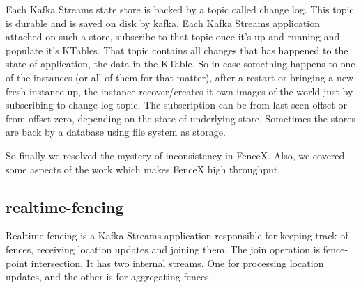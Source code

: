 \documentclass[a4]{report}
\begin{document}
    Each Kafka Streams state store is backed by a topic called change log.
    This topic is durable and is saved on disk by kafka.
    Each Kafka Streams application attached on such a store, subscribe to that topic once it's up and running and
    populate it's KTables.
    That topic contains all changes that has happened to the state of application, the data in the KTable.
    So in case something happens to one of the instances (or all of them for that matter), after a restart or bringing
    a new fresh instance up, the instance recover/creates it own images of the world just by subscribing to change
    log topic.
    The subscription can be from last seen offset or from offset zero, depending on the state of underlying store.
    Sometimes the stores are back by a database using file system as storage.

    So finally we resolved the mystery of inconsistency in FenceX. Also, we covered some aspects of the work which
    makes FenceX high throughput.

    \subsection{realtime-fencing}
    Realtime-fencing is a Kafka Streams application responsible for keeping track of fences, receiving location updates
    and joining them.
    The join operation is fence-point intersection.
    It has two internal streams.
    One for processing location updates, and the other is for aggregating fences.
\end{document}
